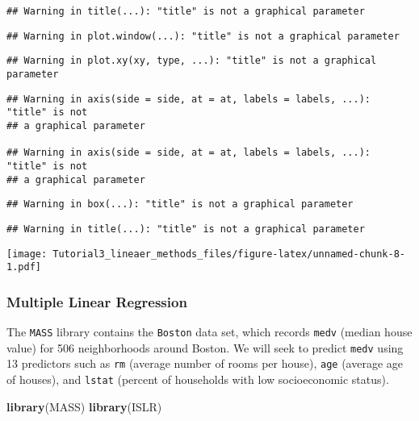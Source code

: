 \documentclass[]{article}
\newenvironment{Shaded}{\begin{snugshade}}{\end{snugshade}}
\newcommand{\KeywordTok}[1]{\textcolor[rgb]{0.13,0.29,0.53}{\textbf{#1}}}
\newcommand{\NormalTok}[1]{#1}
\begin{document}
\begin{verbatim}
## Warning in title(...): "title" is not a graphical parameter
\end{verbatim}

\begin{verbatim}
## Warning in plot.window(...): "title" is not a graphical parameter
\end{verbatim}

\begin{verbatim}
## Warning in plot.xy(xy, type, ...): "title" is not a graphical parameter
\end{verbatim}

\begin{verbatim}
## Warning in axis(side = side, at = at, labels = labels, ...): "title" is not
## a graphical parameter

## Warning in axis(side = side, at = at, labels = labels, ...): "title" is not
## a graphical parameter
\end{verbatim}

\begin{verbatim}
## Warning in box(...): "title" is not a graphical parameter
\end{verbatim}

\begin{verbatim}
## Warning in title(...): "title" is not a graphical parameter
\end{verbatim}

\texttt{[image: Tutorial3\_lineaer\_methods\_files/figure-latex/unnamed-chunk-8-1.pdf]}

\subsubsection{Multiple Linear
Regression}\label{multiple-linear-regression}

The \texttt{MASS} library contains the \texttt{Boston} data set, which
records \texttt{medv} (median house value) for 506 neighborhoods around
Boston. We will seek to predict \texttt{medv} using 13 predictors such
as \texttt{rm} (average number of rooms per house), \texttt{age}
(average age of houses), and \texttt{lstat} (percent of households with
low socioeconomic status).

\begin{Shaded}
\begin{Highlighting}[]
\KeywordTok{library}\NormalTok{(MASS) }
\KeywordTok{library}\NormalTok{(ISLR)}
\end{Highlighting}
\end{Shaded}
\end{document}
